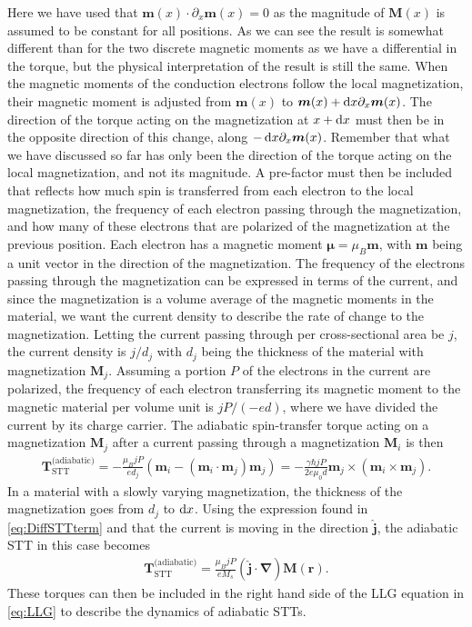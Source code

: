 Here we have used that $\mathbold{m}(x)\cdot\partial_x \mathbold{m}(x) = 0$ as the magnitude of $\mathbold{M}(x)$ is assumed to be constant for all positions. As we can see the result is somewhat different than for the two discrete magnetic moments as we have a differential in the torque, but the physical interpretation of the result is still the same. When the magnetic moments of the conduction electrons follow the local magnetization, their magnetic moment is adjusted from $\mathbold{m}(x)$ to $\mathbold{m}(x) + \d x \partial_x \mathbold{m}(x)$. The direction of the torque acting on the magnetization at $x +\operatorname{d}\!{x}$ must then be in the opposite direction of this change, along $-\d x \partial_x \mathbold{m}(x)$. Remember that what we have discussed so far has only been the direction of the torque acting on the local magnetization, and not its magnitude. A pre-factor must then be included that reflects how much spin is transferred from each electron to the local magnetization, the frequency of each electron passing through the magnetization, and how many of these electrons that are polarized of the magnetization at the previous position. Each electron has a magnetic moment $\mathbold{\mu} = \mu_B \mathbold{m}$, with $\mathbold{m}$ being a unit vector in the direction of the magnetization. The frequency of the electrons passing through the magnetization can be expressed in terms of the current, and since the magnetization is a volume average of the magnetic moments in the material, we want the current density to describe the rate of change to the magnetization. Letting the current passing through per cross-sectional area be $j$, the current density is $j/d_j$ with $d_j$ being the thickness of the material with magnetization $\mathbold{M}_j$. Assuming a portion $P$ of the electrons in the current are polarized, the frequency of each electron transferring its magnetic moment to the magnetic material per volume unit is $jP/(-ed)$, where we have divided the current by its charge carrier. The adiabatic spin-transfer torque acting on a magnetization $\mathbold{M}_j$ after a current passing through a magnetization $\mathbold{M}_i$ is then
\begin{align}
    \mathbold{T}_{\text{STT}}^{\textrm{(adiabatic)}} = -\frac{\mu_B j P}{e d_j} (\mathbold{m}_i-(\mathbold{m}_i\cdot\mathbold{m}_j)\mathbold{m}_j)
    = -\frac{\gamma \hbar jP}{2 e \mu_0 d}\mathbold{m}_j\times\left(\mathbold{m}_i\times\mathbold{m}_j\right).
    \label{eq:STT_Adiabatic_Macro}
\end{align}
In a material with a slowly varying magnetization, the thickness of the magnetization goes from $d_j$ to $\operatorname{d}\!{x}$. Using the expression found in \eqref{eq:DiffSTTterm} and that the current is moving in the direction $\mathbold{\hat{j}}$, the adiabatic STT in this case becomes
\begin{align}
 \mathbold{T}_{\text{STT}}^{\textrm{(adiabatic)}} = \frac{\mu_B j P}{e M_s} (\mathbold{\hat{j}}\cdot\mathbold{\nabla})\mathbold{M}(\mathbold{r}). \label{eq:AdSTTnonuniform}
\end{align}
These torques can then be included in the right hand side of the LLG equation in \eqref{eq:LLG} to describe the dynamics of adiabatic STTs.


